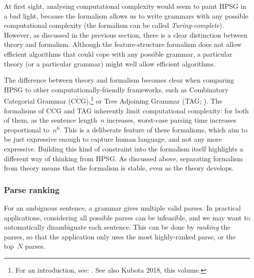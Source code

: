 \documentclass[output=paper]{langsci/langscibook}
\begin{document}
At first sight, analysing computational complexity
would seem to paint HPSG in a bad light,
because the formalism allows us to write grammars
with any possible computational complexity
(the formalism can be called \textit{Turing-complete}).
However, as discussed in the previous section,
there is a clear distinction between theory and formalism.
Although the feature-structure formalism does not allow efficient algorithms
that could cope with any possible grammar,
a particular theory (or a particular grammar) might well allow efficient algorithms.

The difference between theory and formalism
becomes clear when comparing HPSG to other computationally-friendly frameworks,
such as Combinatory Categorial Grammar (CCG),\footnote{%
	For an introduction, see: \citealp{steedman2011ccg}.
	See also Kubota 2018, this volume. %
}
or Tree Adjoining Grammar (TAG; \citealp{FIXME-Joshi}). %
The formalisms of CCG and TAG inherently limit computational complexity:
for both of them, as the sentence length~$n$ increases,
worst-case parsing time increases proportional to~$n^6$.
This is a deliberate feature of these formalisms,
which aim to be just expressive enough to capture human language,
and not any more expressive.
Building this kind of constraint into the formalism itself
highlights a different way of thinking from HPSG.
As discussed above, separating formalism from theory
means that the formalism is stable, even as the theory develops.





\subsubsection{Parse ranking}


For an ambiguous sentence,
a grammar gives multiple valid parses.
In practical applications, considering all possible parses can be infeasible,
and we may want to automatically disambiguate each sentence.
This can be done by \textit{ranking} the parses,
so that the application only uses the most highly-ranked parse,
or the top~$N$ parses.
\end{document}
